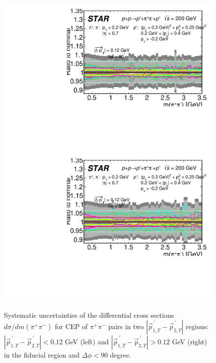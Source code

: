 \begin{figure}[h]
\centering
\hspace*{5pt}
\includegraphics[width=.46\textwidth,page=1]{graphics/systematics/FinalResult_InvMass_pion_SmallDpt_DeltaPhiLessThan90_Systematics2.pdf}
\hfill
\includegraphics[width=.46\textwidth,page=1]{graphics/systematics/FinalResult_InvMass_pion_LargeDpt_DeltaPhiLessThan90_Systematics2.pdf}
\hspace*{5pt}
%
\caption{Systematic uncertainties of the differential cross sections $d\sigma/dm(\pi^+\pi^-)$ for CEP of $\pi^+\pi^-$ pairs in two $|\vec{p}_{1,T}^{\,\prime}-\vec{p}_{2,T}^{\,\prime}|$ regions: $|\vec{p}_{1,T}^{\,\prime}-\vec{p}_{2,T}^{\,\prime}|<0.12$ GeV (left) and $|\vec{p}_{1,T}^{\,\prime}-\vec{p}_{2,T}^{\,\prime}|>0.12$ GeV (right)  in the fiducial region and $\Delta\phi<90$ degree.}
\label{systematics_5}
\end{figure}


